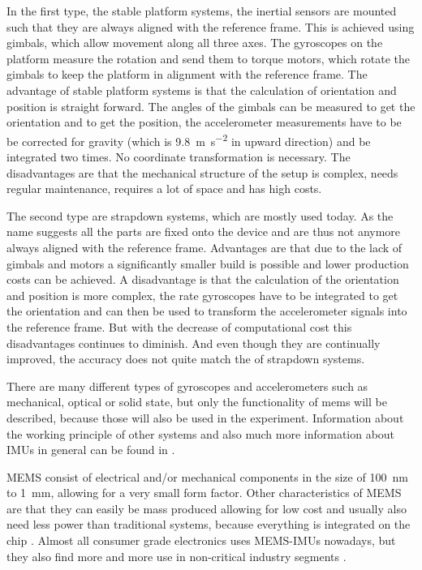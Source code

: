 In the first type, the stable platform systems, the inertial sensors are mounted such that they are always aligned with the reference frame.
This is achieved using gimbals, which allow movement along all three axes. 
The gyroscopes on the platform measure the rotation and send them to torque motors, which rotate the gimbals to keep the platform in alignment with the reference frame. 
The advantage of stable platform systems is that the calculation of orientation and position is straight forward. 
The angles of the gimbals can be measured to get the orientation and to get the position, the accelerometer measurements have to be be corrected for gravity (which is \SI{9.8}{\metre\per\second^2} in upward direction) and be integrated two times.
No coordinate transformation is necessary.
The disadvantages are that the mechanical structure of the setup is complex, needs regular maintenance, requires a lot of space and has high costs.

The second type are strapdown systems, which are mostly used today.  
As the name suggests all the parts are fixed onto the device and are thus not anymore always aligned with the reference frame.
Advantages are that due to the lack of gimbals and motors a significantly smaller build is possible and lower production costs can be achieved.
A disadvantage is that the calculation of the orientation and position is more complex, the rate gyroscopes have to be integrated to get the orientation and can then be used to transform the accelerometer signals into the reference frame.
But with the decrease of computational cost this disadvantages continues to diminish. And even though they are continually improved, the accuracy does not quite match the of strapdown systems.

There are many different types of gyroscopes and accelerometers such as mechanical, optical or solid state, but only the functionality of \gls{mems} will be described, because those will also be used in the experiment. Information about the working principle of other systems and also much more information about IMUs in general can be found in \cite{Woodman07anintroduction}.

MEMS consist of electrical and/or mechanical components in the size of \SI{100}{\nano\metre} to \SI{1}{\milli\metre}, allowing for a very small form factor.
Other characteristics of MEMS are that they can easily be mass produced allowing for low cost and usually also need less power than traditional systems, because everything is integrated on the chip \cite{Shaeffer2013}.
Almost all consumer grade electronics uses MEMS-IMUs nowadays, but they also find more and more use in non-critical industry segments \cite{Perlmutter2016}.

